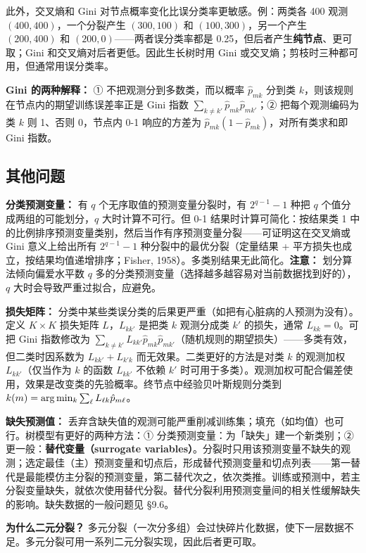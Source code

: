 此外，交叉熵和 Gini 对节点概率变化比误分类率更敏感。例：两类各 400 观测 $(400,400)$，一个分裂产生 $(300,100)$ 和 $(100,300)$，另一个产生 $(200,400)$ 和 $(200,0)$——两者误分类率都是 0.25，但后者产生\textbf{纯节点}、更可取；Gini 和交叉熵对后者更低。因此生长树时用 Gini 或交叉熵；剪枝时三种都可用，但通常用误分类率。

\textbf{Gini 的两种解释：} ① 不把观测分到多数类，而以概率 $\hat p_{mk}$ 分到类 $k$，则该规则在节点内的期望训练误差率正是 Gini 指数 $\sum_{k\neq k'}\hat p_{mk}\hat p_{mk'}$；② 把每个观测编码为类 $k$ 则 1、否则 0，节点内 0-1 响应的方差为 $\hat p_{mk}(1 - \hat p_{mk})$，对所有类求和即 Gini 指数。

\subsection{其他问题}

\textbf{分类预测变量：} 有 $q$ 个无序取值的预测变量分裂时，有 $2^{q-1} - 1$ 种把 $q$ 个值分成两组的可能划分，$q$ 大时计算不可行。但 0-1 结果时计算可简化：按结果类 1 中的比例排序预测变量类别，然后当作有序预测变量分裂——可证明这在交叉熵或 Gini 意义上给出所有 $2^{q-1}-1$ 种分裂中的最优分裂（定量结果 + 平方损失也成立，按结果均值递增排序；Fisher, 1958）。多类别结果无此简化。\textbf{注意：} 划分算法倾向偏爱水平数 $q$ 多的分类预测变量（选择越多越容易对当前数据找到好的），$q$ 大时会导致严重过拟合，应避免。

\textbf{损失矩阵：} 分类中某些类误分类的后果更严重（如把有心脏病的人预测为没有）。定义 $K \times K$ 损失矩阵 $L$，$L_{kk'}$ 是把类 $k$ 观测分成类 $k'$ 的损失，通常 $L_{kk} = 0$。可把 Gini 指数修改为 $\sum_{k \neq k'} L_{kk'}\hat p_{mk}\hat p_{mk'}$（随机规则的期望损失）——多类有效，但二类时因系数为 $L_{kk'} + L_{k'k}$ 而无效果。二类更好的方法是对类 $k$ 的观测加权 $L_{kk'}$（仅当作为 $k$ 的函数 $L_{kk'}$ 不依赖 $k'$ 时可用于多类）。观测加权可配合偏差使用，效果是改变类的先验概率。终节点中经验贝叶斯规则分类到 $k(m) = \arg\min_k \sum_\ell L_{\ell k}\hat p_{m\ell}$。

\textbf{缺失预测值：} 丢弃含缺失值的观测可能严重削减训练集；填充（如均值）也可行。树模型有更好的两种方法：① 分类预测变量：为「缺失」建一个新类别；② 更一般：\textbf{替代变量（surrogate variables）}。分裂时只用该预测变量不缺失的观测；选定最佳（主）预测变量和切点后，形成替代预测变量和切点列表——第一替代是最能模仿主分裂的预测变量，第二替代次之，依次类推。训练或预测中，若主分裂变量缺失，就依次使用替代分裂。替代分裂利用预测变量间的相关性缓解缺失的影响。缺失数据的一般问题见 §9.6。

\textbf{为什么二元分裂？} 多元分裂（一次分多组）会过快碎片化数据，使下一层数据不足。多元分裂可用一系列二元分裂实现，因此后者更可取。

